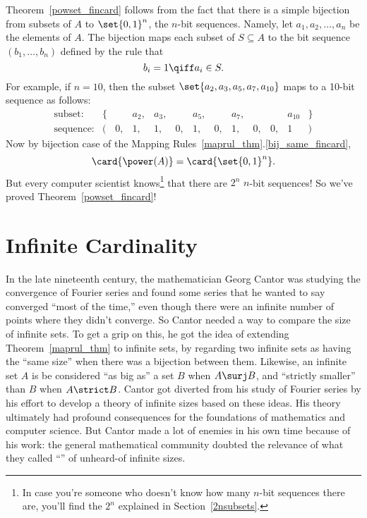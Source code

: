 Theorem~\ref{powset_fincard} follows from the fact that there is a
simple bijection from subsets of $A$ to $\set{0,1}^n$, the $n$-bit
sequences.  Namely, let $a_1, a_2, \dots, a_n$ be the elements of $A$.
The bijection maps each subset of $S \subseteq A$ to the bit sequence
$(b_1, \dots, b_n)$ defined by the rule that
\[
b_i = 1 \qiff a_i \in S.
\]
For example, if $n = 10$, then the subset $\set{a_2, a_3, a_5, a_7,
  a_{10}}$ maps to a 10-bit sequence as follows: %
\[
\begin{array}{rrrrrrrrrrrrr}
\text{subset:} & \{ & & a_2, & a_3, & & a_5, & & a_7, & & & a_{10} &
\} \\ \text{sequence:} & ( & 0, & 1, & 1, & 0, & 1, & 0, & 1, & 0, &
0, & 1 & )
\end{array}
\]
Now by bijection case of the Mapping Rules~\ref{maprul_thm}.\eqref{bij_same_fincard},
\[
\card{\power(A)} = \card{\set{0,1}^n}.
\]
But every computer scientist knows\footnote{In case you're someone who
  doesn't know how many $n$-bit sequences there are, you'll find the
  $2^n$ explained in Section~\ref{2nsubsets}.}
  that there are $2^n$ $n$-bit sequences!  So we've proved
  Theorem~\ref{powset_fincard}!

\section{Infinite Cardinality}\label{infinite_sec}

In the late nineteenth century, the mathematician Georg Cantor was
studying the convergence of Fourier series and found some series that
he wanted to say converged ``most of the time,'' even though there
were an infinite number of points where they didn't converge.  So
Cantor needed a way to compare the size of infinite sets.  To get a
grip on this, he got the idea of extending Theorem~\ref{maprul_thm} to
infinite sets, by regarding two infinite sets as having the ``same
size'' when there was a bijection between them.  Likewise, an infinite
set $A$ is be considered ``as big as'' a set $B$ when $A \surj
B$, and ``strictly smaller'' than $B$ when $A \strict B$.  Cantor got
diverted from his study of Fourier series by his effort to develop a
theory of infinite sizes based on these ideas.  His theory ultimately
had profound consequences for the foundations of mathematics and
computer science.  But Cantor made a lot of enemies in his own time
because of his work: the general mathematical community doubted the
relevance of what they called ``'' of
unheard-of infinite sizes.

